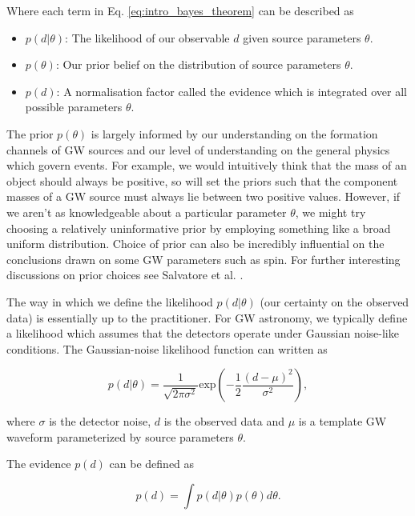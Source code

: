 %
%
Where each term in Eq. \ref{eq:intro_bayes_theorem} can be described as 

\begin{itemize}
    \item $p(d|\theta)$: The likelihood of our observable $d$ given source parameters $\theta$.
    \item $p(\theta)$: Our prior belief on the distribution of source parameters $\theta$.
    \item $p(d)$: A normalisation factor called the evidence which is integrated over all possible parameters $\theta$.
\end{itemize}

The prior $p(\theta)$ is largely informed by our understanding on the formation channels of \ac{GW} sources and our level of understanding on the general physics which govern events. For example, we would intuitively think that the mass of an object should always be positive, so will set the priors such that the component masses of a \ac{GW} source must always lie between two positive values. However, if we aren't as knowledgeable about a particular parameter $\theta$, we might try choosing a relatively uninformative prior by employing something like a broad uniform distribution. Choice of prior can also be incredibly influential on the conclusions drawn on some \ac{GW} parameters such as spin. For further interesting discussions on prior choices see Salvatore et al. \cite{PhysRevLett.119.251103}.

%
%
The way in which we define the likelihood $p(d|\theta)$ (our certainty on the observed data) is essentially up to the practitioner. For \ac{GW} astronomy, we typically define a likelihood which assumes that the detectors operate under Gaussian noise-like conditions. The Gaussian-noise likelihood function can written as 

\begin{equation}
    p(d|\theta) = \frac{1}{\sqrt{2\pi \sigma^2}} \textrm{exp}\left(-\frac{1}{2} 
    \frac{(d - \mu)^2}{\sigma^2}\right),
\end{equation}

where $\sigma$ is the detector noise, $d$ is the observed data and $\mu$ is a template \ac{GW} waveform parameterized by source parameters $\theta$. 

%
%
The evidence $p(d)$ can be defined as 

\begin{equation}
    p(d) = \int p(d|\theta) p(\theta) d\theta.
    \label{eq:evidence}
\end{equation}

